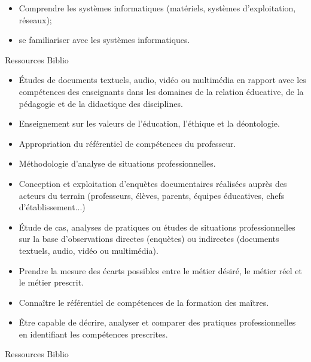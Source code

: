 \documentclass[10pt, a5paper]{report}
\begin{document}
{}
{
\begin{itemize}
\item Comprendre les systèmes informatiques (matériels, systèmes d'exploitation, réseaux);
\item se familiariser avec les systèmes informatiques.
\end{itemize}
}
{Ressources}
{Biblio}
 
\vfill


{
\begin{itemize}
\item \'Etudes de documents textuels, audio, vidéo ou multimédia en rapport avec les compétences des enseignants dans les domaines de la relation éducative, de la pédagogie et de la didactique des disciplines.
\item Enseignement sur les valeurs de l'éducation, l'éthique et la déontologie.
\item Appropriation du référentiel de compétences du professeur.
\item Méthodologie d'analyse de situations professionnelles.
\item Conception et exploitation d'enquètes documentaires réalisées auprès des acteurs du terrain (professeurs, élèves, parents, équipes éducatives, chefs d'établissement...)
\item \'Etude de cas, analyses de pratiques ou études de situations professionnelles sur la base d'observations directes (enquètes) ou indirectes (documents textuels, audio, vidéo ou multimédia).
\end{itemize}
}
{}
{
\begin{itemize}
\item Prendre la mesure des écarts possibles entre le métier désiré, le métier réel et le métier prescrit. 
\item Connaître le référentiel de compétences de la formation des maîtres. 
\item \^Etre capable de décrire, analyser et comparer des pratiques professionnelles en identifiant les compétences prescrites.
\end{itemize}
}
{Ressources} 
{Biblio} 
 
\end{document}
